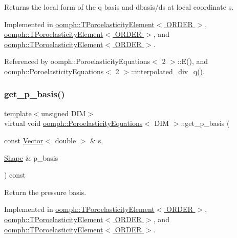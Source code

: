 Returns the local form of the q basis and dbasis/ds at local coordinate s. 



Implemented in \hyperlink{classoomph_1_1TPoroelasticityElement_a1fca2ce3e962fc273d38525d0e1f2865}{oomph\+::\+T\+Poroelasticity\+Element$<$ O\+R\+D\+E\+R $>$}, \hyperlink{classoomph_1_1TPoroelasticityElement_a6999bf7f38c269d952fe56cff1f701ca}{oomph\+::\+T\+Poroelasticity\+Element$<$ O\+R\+D\+E\+R $>$}, and \hyperlink{classoomph_1_1TPoroelasticityElement_a4ab1a8528676f73f652109e16013467a}{oomph\+::\+T\+Poroelasticity\+Element$<$ O\+R\+D\+E\+R $>$}.



Referenced by oomph\+::\+Poroelasticity\+Equations$<$ 2 $>$\+::\+E(), and oomph\+::\+Poroelasticity\+Equations$<$ 2 $>$\+::interpolated\+\_\+div\+\_\+q().

\mbox{\label{classoomph_1_1PoroelasticityEquations_af5dd9aa31ee8da161285e7ed6b7cb8fc}} 
\subsubsection{\texorpdfstring{get\+\_\+p\+\_\+basis()}{get\_p\_basis()}}
{\footnotesize\ttfamily template$<$unsigned D\+IM$>$ \\
virtual void \hyperlink{classoomph_1_1PoroelasticityEquations}{oomph\+::\+Poroelasticity\+Equations}$<$ D\+IM $>$\+::get\+\_\+p\+\_\+basis (\begin{DoxyParamCaption}\item[{const \hyperlink{classoomph_1_1Vector}{Vector}$<$ double $>$ \&}]{s,  }\item[{\hyperlink{classoomph_1_1Shape}{Shape} \&}]{p\+\_\+basis }\end{DoxyParamCaption}) const\hspace{0.3cm}{\ttfamily [pure virtual]}}



Return the pressure basis. 



Implemented in \hyperlink{classoomph_1_1TPoroelasticityElement_a4f319ec9f7c2ce3cb871c060d35bc5e3}{oomph\+::\+T\+Poroelasticity\+Element$<$ O\+R\+D\+E\+R $>$}, \hyperlink{classoomph_1_1TPoroelasticityElement_a331ed84e73c867f6755dcc2f50a167ce}{oomph\+::\+T\+Poroelasticity\+Element$<$ O\+R\+D\+E\+R $>$}, and \hyperlink{classoomph_1_1TPoroelasticityElement_ae5879c618bbfd76e4c720e2d77b39e19}{oomph\+::\+T\+Poroelasticity\+Element$<$ O\+R\+D\+E\+R $>$}.



